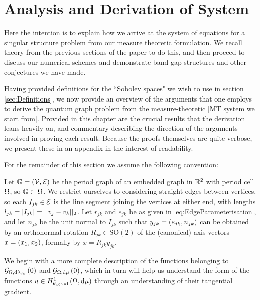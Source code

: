 \section{Analysis and Derivation of System} \label{sec:SystemAndAnalysis}

Here the intention is to explain how we arrive at the system of equations for a singular structure problem from our measure theoretic formulation.
We recall theory from the previous sections of the paper to do this, and then proceed to discuss our numerical schemes and demonstrate band-gap structures and other conjectures we have made. \newline

Having provided definitions for the ``Sobolev spaces" we wish to use in section \ref{sec:Definitions}, we now provide an overview of the arguments that one employs to derive the quantum graph problem  from the measure-theoretic \ref{MT system we start from}.
Provided in this chapter are the crucial results that the derivation leans heavily on, and commentary describing the direction of the arguments involved in proving each result.
Because the proofs themselves are quite verbose, we present these in an appendix  in the interest of readability. \newline

For the remainder of this section we assume the following convention:
\begin{convention} \label{conv:MeasTheoryProblemSetup}
	Let $\mathbb{G}=\left( \mathcal{V},\mathcal{E} \right)$ be the period graph of an embedded graph in $\mathbb{R}^2$ with period cell $\Omega$, so $\mathbb{G}\subset\Omega$.
	We restrict ourselves to considering straight-edges between vertices, so each $I_{jk}\in \mathcal{E}$ is the line segment joining the vertices at either end, with lengths $l_{jk} = \left\lvert I_{jk} \right\rvert = \lvert\lvert v_j-v_k \rvert\rvert_2$.
	Let $r_{jk}$ and $e_{jk}$ be as given in \eqref{eq:EdgeParameterisation}, and let $n_{jk}$ be the unit normal to $I_{jk}$ such that $y_{jk} = \left( e_{jk}, n_{jk} \right)$ can be obtained by an orthonormal rotation $R_{jk}\in\mathrm{SO}(2)$ of the (canonical) axis vectors $x = \left( x_1, x_2 \right)$, formally by $x = R_{jk}y_{jk}$.
\end{convention}
We begin with a more complete description of the functions belonging to $\mathcal{G}_{ \Omega, \mathrm{d}\lambda_{jk}}\left( 0 \right)$ and $\mathcal{G}_{ \Omega, \mathrm{d}\mu}\left( 0 \right)$, which in turn will help us understand the form of the functions $u\in H^1_{\theta, \mathrm{grad}}\left( \Omega, \mathrm{d}\mu \right)$ through an understanding of their tangential gradient.

